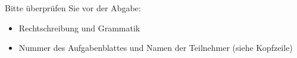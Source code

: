 \documentclass[ngerman]{fbi-aufgabenblatt}
\begin{document}

Bitte überprüfen Sie vor der Abgabe:

\begin{itemize}
	\item Rechtschreibung und Grammatik
	\item Nummer des Aufgabenblattes und Namen der Teilnehmer (siehe Kopfzeile)
\end{itemize}
\end{document}
